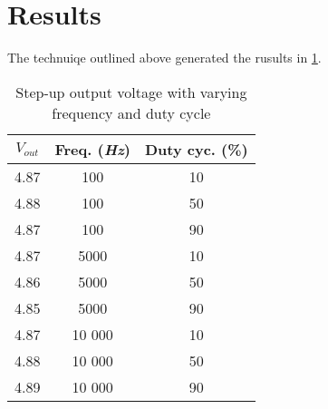 \section{Results}
The technuiqe outlined above generated the rusults in \ref{tab:meas}.
\begin{table}[h]
    \begin{center}
        \caption{Step-up output voltage with varying frequency and duty cycle}
        \label{tab:meas}
        \begin{tabular}{c|c|c}
            $V_{out}$ & Freq. (\textit{Hz}) & Duty cyc. (\%)\\
            \hline
            4.87 & 100 & 10\\
            4.88 & 100 & 50\\
            4.87 & 100 & 90\\
            4.87 & 5000 & 10\\
            4.86 & 5000 & 50\\
            4.85 & 5000 & 90\\
            4.87 & 10 000 & 10\\
            4.88 & 10 000 & 50\\
            4.89 & 10 000 & 90\\
        \end{tabular}
    \end{center}
\end{table}
